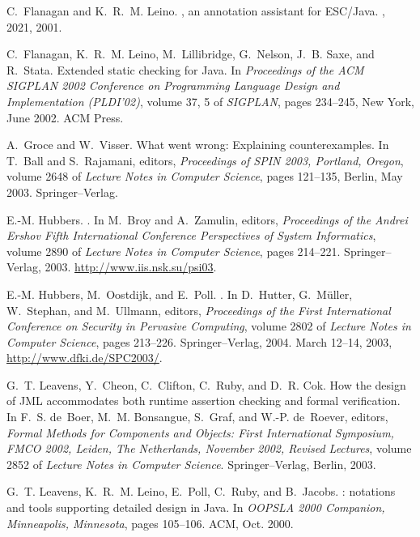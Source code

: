 \documentclass{llncs}
\begin{document}
\begin{thebibliography}{10}
C.~Flanagan and K.~R.~M. Leino.
, an annotation assistant for {ESC/Java}.
, 2021, 2001.

C.~Flanagan, K.~R.~M. Leino, M.~Lillibridge, G.~Nelson, J.~B. Saxe, and
  R.~Stata.
\newblock Extended static checking for {Java}.
\newblock In {\em Proceedings of the {ACM} {SIGPLAN} 2002 Conference on
  Programming Language Design and Implementation ({PLDI}'02)}, volume 37, 5 of
  {\em SIGPLAN}, pages 234--245, New York, June 2002. ACM Press.

A.~Groce and W.~Visser.
\newblock What went wrong: Explaining counterexamples.
\newblock In T.~Ball and S.~Rajamani, editors, {\em Proceedings of SPIN 2003,
  Portland, Oregon}, volume 2648 of {\em Lecture Notes in Computer Science},
  pages 121--135, Berlin, May 2003. Springer--Verlag.

E.-M. Hubbers.
.
\newblock In M.~Broy and A.~Zamulin, editors, {\em {Proceedings of the Andrei
  Ershov Fifth International Conference Perspectives of System Informatics}},
  volume 2890 of {\em Lecture Notes in Computer Science}, pages 214--221.
  Springer--Verlag, 2003.
\newblock \url{http://www.iis.nsk.su/psi03}.

E.-M. Hubbers, M.~Oostdijk, and E.~Poll.
.
\newblock In D.~Hutter, G.~M{\"u}ller, W.~Stephan, and M.~Ullmann, editors,
  {\em {Proceedings of the First International Conference on Security in
  Pervasive Computing}}, volume 2802 of {\em Lecture Notes in Computer
  Science}, pages 213--226. Springer--Verlag, 2004.
\newblock March 12--14, 2003, \url{http://www.dfki.de/SPC2003/}.

G.~T. Leavens, Y.~Cheon, C.~Clifton, C.~Ruby, and D.~R. Cok.
\newblock How the design of {JML} accommodates both runtime assertion checking
  and formal verification.
\newblock In F.~S. de~Boer, M.~M. Bonsangue, S.~Graf, and W.-P. de~Roever,
  editors, {\em Formal Methods for Components and Objects: First International
  Symposium, FMCO 2002, Leiden, The Netherlands, November 2002, Revised
  Lectures}, volume 2852 of {\em Lecture Notes in Computer Science}.
  Springer--Verlag, Berlin, 2003.

G.~T. Leavens, K.~R.~M. Leino, E.~Poll, C.~Ruby, and B.~Jacobs.
: notations and tools supporting detailed design in {Java}.
\newblock In {\em OOPSLA 2000 Companion, Minneapolis, Minnesota}, pages
  105--106. ACM, Oct. 2000.


\end{thebibliography}
\end{document}
